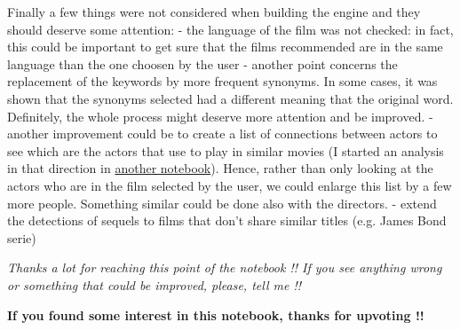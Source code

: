 Finally a few things were not considered when building the engine and
they should deserve some attention: - the language of the film was not
checked: in fact, this could be important to get sure that the films
recommended are in the same language than the one choosen by the user -
another point concerns the replacement of the keywords by more frequent
synonyms. In some cases, it was shown that the synonyms selected had a
different meaning that the original word. Definitely, the whole process
might deserve more attention and be improved. - another improvement
could be to create a list of connections between actors to see which are
the actors that use to play in similar movies (I started an analysis in
that direction in
\href{https://www.kaggle.com/fabiendaniel/categorizing-actors}{another
notebook}). Hence, rather than only looking at the actors who are in the
film selected by the user, we could enlarge this list by a few more
people. Something similar could be done also with the directors. -
extend the detections of sequels to films that don't share similar
titles (e.g. James Bond serie)

    \emph{Thanks a lot for reaching this point of the notebook !! If you see
anything wrong or something that could be improved, please, tell me !!}

\textbf{If you found some interest in this notebook, thanks for upvoting
!!}

    \begin{tcolorbox}[breakable, size=fbox, boxrule=1pt, pad at break*=1mm,colback=cellbackground, colframe=cellborder]
\begin{Verbatim}[commandchars=\\\{\}]

\end{Verbatim}
\end{tcolorbox}

